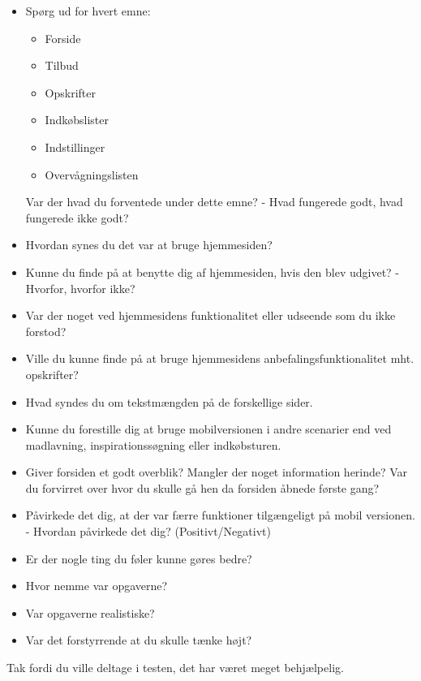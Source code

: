 \begin{itemize}
	\item Spørg ud for hvert emne:
	\begin{itemize}
		\item Forside
		\item Tilbud
		\item Opskrifter
		\item Indkøbslister
		\item Indstillinger
		\item Overvågningslisten
	\end{itemize}
	Var der hvad du forventede under dette emne? - Hvad fungerede godt, hvad fungerede ikke godt?
	\item Hvordan synes du det var at bruge hjemmesiden?
	\item Kunne du finde på at benytte dig af hjemmesiden, hvis den blev udgivet? - Hvorfor, hvorfor ikke?
	\item Var der noget ved hjemmesidens funktionalitet eller udseende som du ikke forstod?
	\item Ville du kunne finde på at bruge hjemmesidens anbefalingsfunktionalitet mht. opskrifter?
	\item Hvad syndes du om tekstmængden på de forskellige sider.
	\item Kunne du forestille dig at bruge mobilversionen i andre scenarier end ved madlavning, inspirationssøgning eller indkøbsturen.
	
	\item Giver forsiden et godt overblik? Mangler der noget information herinde? Var du forvirret over hvor du skulle gå hen da forsiden åbnede første gang?
	\item Påvirkede det dig, at der var færre funktioner tilgængeligt på mobil versionen. - Hvordan påvirkede det dig? (Positivt/Negativt)
	\item Er der nogle ting du føler kunne gøres bedre?
	\item Hvor nemme var opgaverne?
	\item Var opgaverne realistiske?
	\item Var det forstyrrende at du skulle tænke højt?
\end{itemize}	

Tak fordi du ville deltage i testen, det har været meget behjælpelig.
